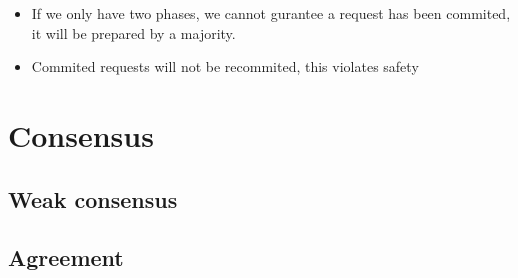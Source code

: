 \documentclass{easyclass}
\begin{document}
\begin{itemize}
    \item If we only have two phases, we cannot gurantee a request has been commited,
    it will be prepared by a majority.
    \item Commited requests will not be recommited, this violates safety
\end{itemize}
\chapter{Consensus}
\section{Weak consensus}
\section{Agreement}
%


\cite{Gao}


\end{document}

